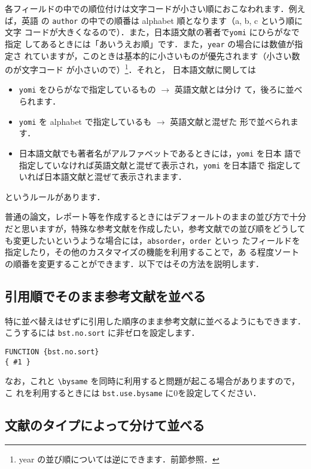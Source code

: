 \documentclass[article]{jlreq}
\begin{document}
各フィールドの中での順位付けは文字コードが小さい順におこなわれます．例えば，英語
の \texttt{author} の中での順番は alphabet 順となります（a, b, c という順に文字
コードが大きくなるので）．また，日本語文献の著者で\texttt{yomi} にひらがなで指定
してあるときには「あいうえお順」です．また，\texttt{year} の場合には数値が指定さ
れていますが，このときは基本的に小さいものが優先されます（小さい数のが文字コード
が小さいので）\footnote{year の並び順については逆にできます．前節参照．}．それと，
日本語文献に関しては
\begin{itemize}
 \item \texttt{yomi} をひらがなで指定しているもの $\rightarrow$ 英語文献とは分け
       て，後ろに並べられます．
 \item \texttt{yomi} を alphabet で指定しているも $\rightarrow$ 英語文献と混ぜた
       形で並べられます．
 \item 日本語文献でも著者名がアルファベットであるときには，\texttt{yomi} を日本
       語で指定していなければ英語文献と混ぜて表示され，\texttt{yomi} を日本語で
       指定していれば日本語文献と混ぜて表示されまます．
\end{itemize}
というルールがあります．

普通の論文，レポート等を作成するときにはデフォールトのままの並び方で十分
だと思いますが，特殊な参考文献を作成したい，参考文献での並び順をどうして
も変更したいというような場合には，\texttt{absorder}，\texttt{order} といっ
たフィールドを指定したり，その他のカスタマイズの機能を利用することで，あ
る程度ソートの順番を変更することができます．以下ではその方法を説明します．

\subsection{引用順でそのまま参考文献を並べる}

特に並べ替えはせずに引用した順序のまま参考文献に並べるようにもできます．
こうするには \texttt{bst.no.sort} に非ゼロを設定します．
\begin{screen}
\begin{verbatim}
FUNCTION {bst.no.sort}
{ #1 }
\end{verbatim}
\end{screen}

なお，これと \verb|\bysame| を同時に利用すると問題が起こる場合がありますので，こ
れを利用するときには \texttt{bst.use.bysame} に0を設定してください．

\subsection{文献のタイプによって分けて並べる}
\end{document}
